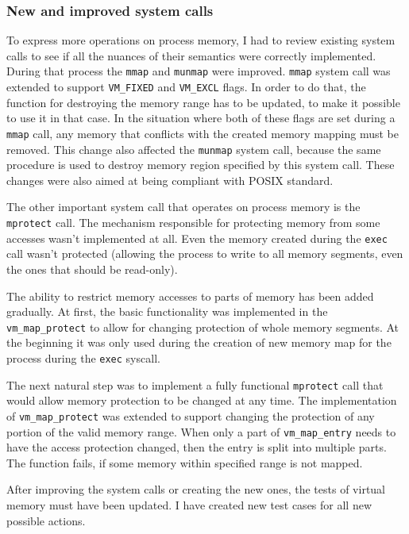 \subsubsection{New and improved system calls}

To express more operations on process memory, I had to review existing system calls to see if all the nuances of their semantics were correctly implemented.
During that process the {\tt mmap} and {\tt munmap} were improved.
{\tt mmap} system call was extended to support \texttt{VM_FIXED} and \texttt{VM_EXCL} flags.
In order to do that, the function for destroying the memory range has to be updated, to make it possible to use it in that case.
In the situation where both of these flags are set during a {\tt mmap} call, any memory that conflicts with the created memory mapping must be removed.
This change also affected the {\tt munmap} system call, because the same procedure is used to destroy memory region specified by this system call.
These changes were also aimed at being compliant with POSIX \cite{posix} standard.

The other important system call that operates on process memory is the {\tt mprotect} call.
The mechanism responsible for protecting memory from some accesses wasn't implemented at all.
Even the memory created during the {\tt exec} call wasn't protected (allowing the process to write to all memory segments, even the ones that should be read-only).

The ability to restrict memory accesses to parts of memory has been added gradually.
At first, the basic functionality was implemented in the \texttt{vm_map_protect} to allow for changing protection of whole memory segments.
At the beginning it was only used during the creation of new memory map for the process during the {\tt exec} syscall.

The next natural step was to implement a fully functional {\tt mprotect} call that would allow memory protection to be changed at any time.
The implementation of \texttt{vm_map_protect} was extended to support changing the protection of any portion of the valid memory range.
When only a part of \texttt{vm_map_entry} needs to have the access protection changed, then the entry is split into multiple parts.
The function fails, if some memory within specified range is not mapped.

After improving the system calls or creating the new ones, the tests of virtual memory must have been updated.
I have created new test cases for all new possible actions.

